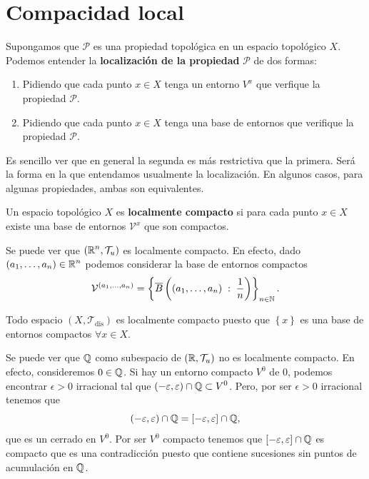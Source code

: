 \section{Compacidad local}
\begin{notation}
Supongamos que $\displaystyle \mathcal{P} $ es una propiedad topológica en un espacio topológico $\displaystyle X $. Podemos entender la \textbf{localización de la propiedad} $\displaystyle \mathcal{P} $ de dos formas:
\begin{enumerate}
\item Pidiendo que cada punto $\displaystyle x \in X $ tenga un entorno $\displaystyle V^{x} $ que verfique la propiedad $\displaystyle \mathcal{P} $.
\item Pidiendo que cada punto $\displaystyle x \in X $ tenga una base de entornos que verifique la propiedad $\displaystyle \mathcal{P} $. 
\end{enumerate}
Es sencillo ver que en general la segunda es más restrictiva que la primera. Será la forma en la que entendamos usualmente la localización. En algunos casos, para algunas propiedades, ambas son equivalentes. 
\end{notation}
\begin{definition}
Un espacio topológico $\displaystyle X $ es \textbf{localmente compacto} si para cada punto $\displaystyle x \in X $ existe una base de entornos $\displaystyle \mathcal{V}^{x} $ que son compactos. 
\end{definition}
\begin{eg}
Se puede ver que $\displaystyle \left(\mathbb{R}^{n}, \mathcal{T}_{u}\right) $ es localmente compacto. En efecto, dado $\displaystyle \left(a_{1}, \ldots, a_{n}\right)\in \mathbb{R}^{n} $ podemos considerar la base de entornos compactos
\[\mathcal{V}^{\left(a_{1}, \ldots, a_{n}\right)} = \left\{ \overline{B}\left(\left(a_{1}, \ldots, a_{n}\right)\; : \; \frac{1}{n}\right)\right\} _{n \in \mathbb{N}} .\]
\end{eg}
\begin{eg}
	Todo espacio $\displaystyle \left(X, \mathcal{T}_{\text{dis}}\right) $ es localmente compacto puesto que $\displaystyle \left\{ x\right\}  $ es una base de entornos compactos $\displaystyle \forall x \in X $.
\end{eg}
\begin{eg}
Se puede ver que $\displaystyle \mathbb{Q} $ como subespacio de $\displaystyle \left(\mathbb{R}, \mathcal{T}_{u}\right) $ no es localmente compacto. En efecto, consideremos $\displaystyle 0 \in \mathbb{Q} $. Si hay un entorno compacto $\displaystyle V^{0} $ de $\displaystyle 0 $, podemos encontrar $\displaystyle \epsilon > 0 $ irracional tal que $\displaystyle \left(-\varepsilon, \varepsilon \right)\cap \mathbb{Q} \subset V^{0} $. Pero, por ser $\displaystyle \epsilon > 0 $ irracional tenemos que 
\[\left(-\varepsilon, \varepsilon \right)\cap \mathbb{Q} = \left[-\varepsilon, \varepsilon \right] \cap \mathbb{Q} ,\]
que es un cerrado en $\displaystyle V^{0} $. Por ser $\displaystyle V^{0} $ compacto tenemos que $\displaystyle \left[-\varepsilon, \varepsilon \right] \cap \mathbb{Q} $ es compacto que es una contradicción puesto que contiene sucesiones sin puntos de acumulación en $\displaystyle \mathbb{Q} $. 
\end{eg}
